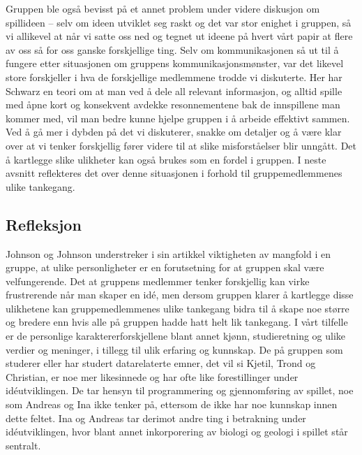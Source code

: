 Gruppen ble også bevisst på et annet problem under videre diskusjon
om spillideen – selv om ideen utviklet seg raskt og det var stor enighet
i gruppen, så vi allikevel at når vi satte oss ned og tegnet ut ideene
på hvert vårt papir at flere av oss så for oss ganske forskjellige ting.
Selv om kommunikasjonen så ut til å fungere etter situasjonen om
gruppens kommunikasjonsmønster, var det likevel store forskjeller i hva
de forskjellige medlemmene trodde vi diskuterte. Her har Schwarz en
teori om at man ved å dele all relevant informasjon, og alltid spille
med åpne kort og konsekvent avdekke resonnementene bak de innspillene
man kommer med, vil man bedre kunne hjelpe gruppen i å arbeide effektivt
sammen. Ved å gå mer i dybden på det vi diskuterer, snakke om detaljer
og å være klar over at vi tenker forskjellig fører videre til at slike
misforståelser blir unngått. Det å kartlegge slike ulikheter kan også
brukes som en fordel i gruppen. I neste avsnitt reflekteres det over
denne situasjonen i forhold til gruppemedlemmenes ulike tankegang.

	\subsection{Refleksjon} %
	Johnson og Johnson \cite{Johnson} understreker i sin artikkel viktigheten av mangfold i en gruppe, at ulike personligheter er en forutsetning for at gruppen skal være velfungerende. Det at gruppens medlemmer tenker forskjellig kan virke frustrerende når man skaper en idé, men dersom gruppen klarer å kartlegge disse ulikhetene kan gruppemedlemmenes ulike tankegang bidra til å skape noe større og bredere enn hvis alle på gruppen hadde hatt helt lik tankegang. I vårt tilfelle er de personlige karaktererforskjellene blant annet kjønn, studieretning og ulike verdier og meninger, i tillegg til ulik erfaring og kunnskap. De på gruppen som studerer eller har studert datarelaterte emner, det vil si Kjetil, Trond og Christian, er noe mer likesinnede og har ofte like forestillinger under idéutviklingen. De tar hensyn til programmering og gjennomføring av spillet, noe som Andreas og Ina ikke tenker på, ettersom de ikke har noe kunnskap innen dette feltet. Ina og Andreas tar derimot andre ting i betrakning under idéutviklingen, hvor blant annet inkorporering av biologi og geologi i spillet står sentralt.

